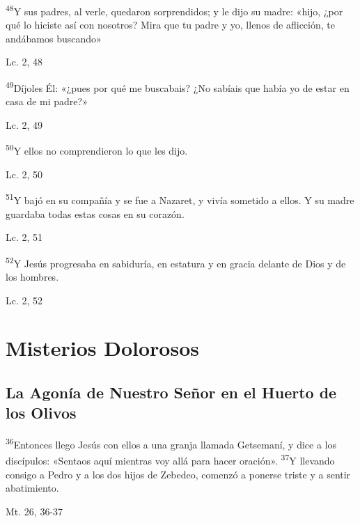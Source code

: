 \documentclass[a4paper,11pt]{article}
\begin{document}
      \textsuperscript{48}Y sus padres, al verle, quedaron sorprendidos; y le dijo su madre: «hijo, ¿por qué lo hiciste así con nosotros? Mira que tu padre
      y yo, llenos de aflicción, te andábamos buscando»
      \begin{flushright}
        Lc. 2, 48     
      \end{flushright}
      
      \textsuperscript{49}Díjoles Él: «¿pues por qué me buscabais? ¿No sabíais que había yo de estar en casa de mi padre?»
      \begin{flushright}
        Lc. 2, 49        
      \end{flushright}
      
      \textsuperscript{50}Y ellos no comprendieron lo que les dijo.
      \begin{flushright}
        Lc. 2, 50        
      \end{flushright}
      
      \textsuperscript{51}Y bajó en su compañía y se fue a Nazaret, y vivía sometido a ellos. Y su madre guardaba todas estas
      cosas en su corazón.
      \begin{flushright}
        Lc. 2, 51       
      \end{flushright}     
      
      \textsuperscript{52}Y Jesús progresaba en sabiduría, en estatura y en gracia delante de Dios y de los hombres.
      \begin{flushright}
        Lc. 2, 52        
      \end{flushright}
            
    \newpage
        
  \section*{\hfil Misterios Dolorosos \hfil}
    
    \subsection*{\hfil La Agonía de Nuestro Señor en el Huerto de los Olivos \hfil}
      
      \textsuperscript{36}Entonces llego Jesús con ellos a una granja llamada Getsemaní, y dice a los discípulos: «Sentaos aquí mientras voy allá para hacer oración». 
      \textsuperscript{37}Y llevando consigo a Pedro y a los dos hijos de Zebedeo, comenzó a ponerse triste y a sentir abatimiento.
      \begin{flushright}
        Mt. 26, 36-37     
      \end{flushright}
\end{document}

